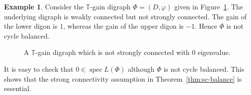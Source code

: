 \documentclass[12pt]{article}
\theoremstyle{definition}
\newtheorem{example}[theorem]{Example}
\DeclareMathOperator{\spec}{spec}
\begin{document}
\begin{example}\label{ex:weak-zero}
Consider the $\mathbb{T}$-gain digraph $\Phi=(D,\varphi)$ given in
Figure~\ref{fig:weak}. The underlying digraph is weakly connected but not strongly connected. The gain of the lower digon is $1$, whereas the gain of the upper digon is $-1$. Hence $\Phi$ is not cycle balanced.

\begin{figure}[ht]
\centering
{}
\caption{A $\mathbb{T}$-gain digraph which is not strongly connected with $0$ eigenvalue.}
\label{fig:weak}
\end{figure}

It is easy to check that $0\in\spec L(\Phi)$ although $\Phi$ is not cycle balanced. This shows that the strong connectivity assumption in Theorem~\ref{thm:sc-balance} is essential.



\end{example}
\end{document}
